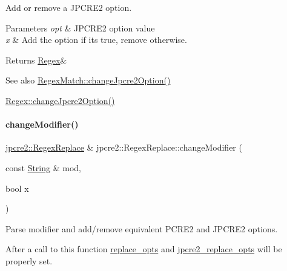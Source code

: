 Add or remove a J\+P\+C\+R\+E2 option. 


\begin{DoxyParams}{Parameters}
{\em opt} & J\+P\+C\+R\+E2 option value \\
\hline
{\em x} & Add the option if it\textquotesingle{}s true, remove otherwise. \\
\hline
\end{DoxyParams}
\begin{DoxyReturn}{Returns}
\hyperlink{classjpcre2_1_1Regex}{Regex}\& 
\end{DoxyReturn}
\begin{DoxySeeAlso}{See also}
\hyperlink{classjpcre2_1_1RegexMatch_a154430c66b8794d6632be6211a3ce870_a154430c66b8794d6632be6211a3ce870}{Regex\+Match\+::change\+Jpcre2\+Option()} 

\hyperlink{classjpcre2_1_1Regex_ab8e0b1a49eeb1077ba54cf3b5292c95e_ab8e0b1a49eeb1077ba54cf3b5292c95e}{Regex\+::change\+Jpcre2\+Option()} 
\end{DoxySeeAlso}
\hypertarget{classjpcre2_1_1RegexReplace_a0a2dc39fc28e6f7fe0a5d638f5891bdb_a0a2dc39fc28e6f7fe0a5d638f5891bdb}{}\label{classjpcre2_1_1RegexReplace_a0a2dc39fc28e6f7fe0a5d638f5891bdb_a0a2dc39fc28e6f7fe0a5d638f5891bdb} 
\paragraph{\texorpdfstring{change\+Modifier()}{changeModifier()}}
{\footnotesize\ttfamily \hyperlink{classjpcre2_1_1RegexReplace}{jpcre2\+::\+Regex\+Replace} \& jpcre2\+::\+Regex\+Replace\+::change\+Modifier (\begin{DoxyParamCaption}\item[{const \hyperlink{namespacejpcre2_a91f03070152fb228bc116c5a737f1d16}{String} \&}]{mod,  }\item[{bool}]{x }\end{DoxyParamCaption})}



Parse modifier and add/remove equivalent P\+C\+R\+E2 and J\+P\+C\+R\+E2 options. 

After a call to this function \hyperlink{classjpcre2_1_1RegexReplace_afc79699cfcad8b7cbb26864b6b67cdc7}{replace\+\_\+opts} and \hyperlink{classjpcre2_1_1RegexReplace_acf13bcb16918df4b7bcaa7e49a1c7d59}{jpcre2\+\_\+replace\+\_\+opts} will be properly set.

